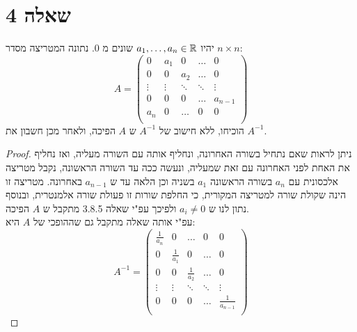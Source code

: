 \documentclass{article}
\begin{document}
	\pagebreak
	\section*{שאלה 4}
יהיו $a_1, \dots, a_n \in \mathbb{R}$ שונים מ 0. נתונה המטריצה מסדר $n \times n$:
\[ A = \begin{pmatrix}
	 0 & a_1 & 0 & \dots & 0 \\
	 0 & 0 & a_2 & \dots & 0 \\
	 \vdots & \vdots & \ddots & \ddots & \vdots \\
	 0 & 0 & 0 & \dots & a_{n-1} \\
	 a_n & 0 & \dots & 0 & 0 \\
\end{pmatrix} \]
הוכיחו, ללא חישוב של $A^{-1}$ ש $A$ הפיכה, ולאחר מכן חשבון את $A^{-1}$.
\begin{proof}
	ניתן לראות שאם נתחיל בשורה האחרונה, ונחליף אותה עם השורה מעליה, ואז נחליף את האחת לפני האחרונה עם זאת שמעליה,
	ונעשה ככה עד השורה הראשונה, נקבל מטריצה אלכסונית עם $a_n$ בשורה הראשונה $a_1$ בשניה וכן הלאה עד ש $a_{n-1}$ באחרונה.
	מטריצה זו הינה שקולת שורה למטריצה המקורית, כי החלפת שורות זו פעולת שורה אלמנטרית, ובנוסף נתון לנו ש $a_i \neq 0$
	ולפיכך עפ"י שאלה 3.8.5 מתקבל ש $A$ הפיכה. \\
	עפ"י אותה שאלה מתקבל גם שההופכי של $A$ היא:
	\[ A^{-1} = \begin{pmatrix}
		\frac{1}{a_n} & 0 & \dots & 0 & 0 \\
		0 & \frac{1}{a_1} & 0 & \dots & 0 \\
		0 & 0 & \frac{1}{a_2} & \dots & 0 \\
		\vdots & \vdots & \ddots & \ddots & \vdots \\
		0 & 0 & 0 & \dots & \frac{1}{a_{n-1}} \\
   \end{pmatrix} \]
\end{proof}


	\pagebreak
\end{document}
